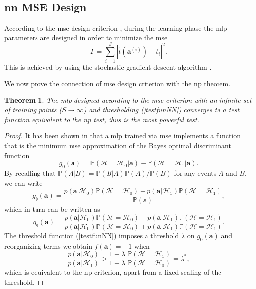 \documentclass[draftcls,onecolumn,12pt]{IEEEtran}
\newcommand{\ai}{\bm{a}^{(i)}}
\newtheorem{theorem}{Theorem}
\begin{document}
\subsection{\ac{nn} MSE Design}
\label{sec: mse_train}

According to the \ac{mse} design criterion \cite{goodfellow}, during the learning phase the \ac{mlp} parameters are designed in order to minimize 
the \ac{mse} 
\begin{equation}
\Gamma = \sum_{i=1}^S |\tilde{t}(\ai) - t_i|^2.
\end{equation}
This is achieved by using the stochastic gradient descent algorithm \cite{Bishop2006}.

We now prove the connection of \ac{mse} design criterion with the \ac{np} theorem.
\begin{theorem}
\label{th:nn_np}
The \ac{mlp}  designed according to the  \ac{mse} criterion with an infinite set of training points ($S \rightarrow \infty$) and thresholding (\ref{testfunNN}) converges to a test function equivalent to the \ac{np} test, thus is the most powerful test.
\end{theorem}
\begin{proof}
It has been shown in \cite{Ruck-90} that a \ac{mlp} trained via \ac{mse} implements a function that is the minimum \ac{mse} approximation of the Bayes optimal discriminant function
\begin{equation}\label{eq:bayesDisc}
g_0(\bm{a}) = \mathbb{P}(\mathcal{H}=\mathcal{H}_0|\bm{a}) - \mathbb{P}(\mathcal{H}=\mathcal{H}_1|\bm{a}).
\end{equation} 
By recalling that $\mathbb{P}(A|B)=\mathbb{P}(B|A)\mathbb{P}(A)/\mathbb{P}(B)$ for any events $A$ and $B$, we can write
\begin{equation}
g_0(\bm{a}) = \frac{p(\bm{a}|\mathcal H_0){\mathbb P}(\mathcal{H}=\mathcal H_0) - p(\bm{a}|\mathcal H_1){\mathbb P}(\mathcal{H}=\mathcal H_1)}{\mathbb P(\bm{a})},
\end{equation}
which in turn can be written as
\begin{equation}
g_0(\bm{a}) = \frac{p(\bm{a}|\mathcal H_0){\mathbb P}(\mathcal{H}=\mathcal H_0) - p(\bm{a}|\mathcal H_1){\mathbb P}(\mathcal{H}=\mathcal H_1)}{p(\bm{a}|\mathcal H_0){\mathbb P}(\mathcal{H}=\mathcal H_0) + p(\bm{a}|\mathcal H_1){\mathbb P}(\mathcal{H}=\mathcal H_1)}.
\end{equation}
The threshold function (\ref{testfunNN}) imposes a threshold $\lambda$ on $g_0(\bm{a})$ and reorganizing terms we obtain $f(\bm{a}) = -1$ when
\begin{equation}
\frac{p(\bm{a}|\mathcal H_0)}{p(\bm{a}|\mathcal H_1)}> \frac{1 + \lambda}{1-\lambda} \, \frac{{\mathbb P}(\mathcal{H}=\mathcal H_1)}{{\mathbb P}(\mathcal{H}=\mathcal H_0)}  = \lambda^*,
\end{equation}
which is equivalent to the \ac{np} criterion, apart from a fixed scaling of the threshold.
\end{proof}
\end{document}
